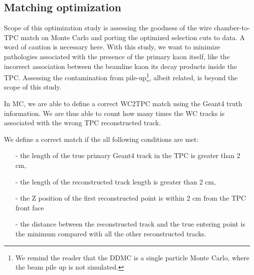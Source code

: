 

\subsection{Matching optimization}\label{ch:WC2TPCMatchOptimization}
Scope of this optimization study is assessing the goodness of the wire chamber-to-TPC match on Monte Carlo and porting the optimized selection cuts to data. A word of caution is necessary here. With this study, we want to minimize pathologies associated with the presence of the primary kaon itself, like the incorrect association between the beamline kaon its decay products inside the TPC.  Assessing the contamination from pile-up\footnote{We remind the reader that the DDMC is a single particle Monte Carlo, where the beam pile up is not simulated.}, albeit related, is beyond the scope of this study.

In MC, we are able to define a correct WC2TPC match using the Geant4 truth information. We are thus able to count how many times the WC tracks is associated with the wrong TPC reconstructed track. 

We define a correct match if the all following conditions are met:
\begin{itemize}
\item[-] the length of the true primary Geant4 track in the TPC is greater than 2 cm,  
\item[-] the length of the reconstructed track length is greater than 2 cm,
\item[-] the Z position of the first reconstructed point is within 2 cm from the TPC front face
\item[-] the distance between the reconstructed track and the true entering point is the minimum compared with all the other reconstructed tracks.
\end{itemize}


